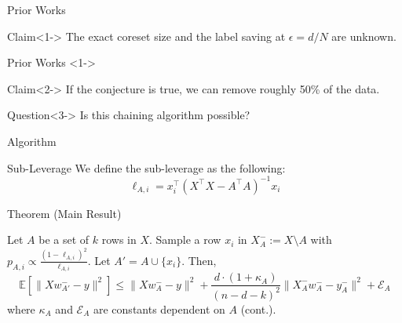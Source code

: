 \documentclass{beamer}
\newcommand{\EE}{\mathbb{E}}
\begin{document}
\begin{frame}{Prior Works}
    \begin{block}{Claim}<1->
        The exact coreset size and the label saving at $\epsilon = d/N$ are unknown. 
    \end{block}
\end{frame}

\begin{frame}{Prior Works}
    <1->
    \vfill
    \begin{block}{Claim}<2->
        If the conjecture is true, we can remove roughly 50\% of the data.
    \end{block}
    \begin{block}{Question}<3->
        Is this chaining algorithm possible?
    \end{block}
    
\end{frame}
\begin{frame}{Algorithm}
\begin{block}{Sub-Leverage}
We define the sub-leverage as the following:
    $$
    \ell_{A,i} = x_i^\intercal (X^\intercal X - A^\intercal A)^{-1} x_i
    $$
\end{block}

\begin{block}{Theorem (Main Result)}
    
Let $A$ be a set of $k$ rows in $X$. Sample a row $x_i$ in $X_A^-:=X\setminus A$ with $p_{A, i} \propto \frac{(1 - \ell_{A, i} )^2}{\ell_{A, i} }$. Let $A' = A \cup \{x_i\}$. Then,
\begin{equation*}
    \EE\left[ \| Xw_{A'}^- - y \|^2 \right] \leq \| Xw_{A}^- - y \|^2 + \frac{d \cdot (1 + \kappa_A)}{(n - d - k)^2} \| X_A^- w_A^- - y_A^- \|^2 + \mathcal{E}_A
\end{equation*}
where $\kappa_A$ and $\mathcal{E}_A$ are constants dependent on $A$ (cont.).
\end{block}
\end{frame}
\end{document}
